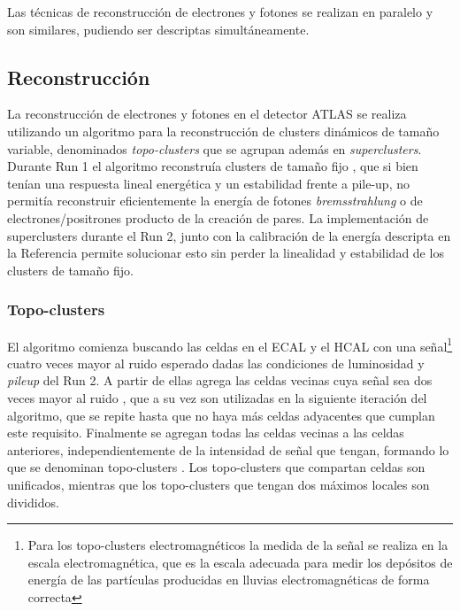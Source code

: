 Las técnicas de reconstrucción de electrones y fotones se realizan en paralelo y son similares, pudiendo ser descriptas simultáneamente.

\subsection{Reconstrucción}


La reconstrucción de electrones y fotones en el detector ATLAS se realiza utilizando un algoritmo para la reconstrucción de clusters dinámicos de tamaño variable, denominados \textit{topo-clusters} que se agrupan además en \textit{superclusters}\cite{EGAM-2018-01}. Durante Run 1 el algoritmo reconstruía clusters de tamaño fijo \cite{PERF-2013-04, PERF-2013-05, Lampl:1099735}, que si bien tenían una respuesta lineal energética y un estabilidad frente a pile-up, no permitía reconstruir eficientemente la energía de fotones \textit{bremsstrahlung} o de electrones/positrones producto de la creación de pares. La implementación de superclusters durante el Run 2, junto con la calibración de la energía descripta en la Referencia \cite{PERF-2017-03} permite solucionar esto sin perder la linealidad y estabilidad de los clusters de tamaño fijo.

\subsubsection{Topo-clusters}

El algoritmo comienza buscando las celdas en el ECAL y el HCAL con una señal\footnote{Para los topo-clusters electromagnéticos la medida de la señal se realiza en la escala electromagnética, que es la escala adecuada para medir los depósitos de energía de las partículas producidas en lluvias electromagnéticas de forma correcta} cuatro veces mayor al ruido esperado dadas las condiciones de luminosidad y \textit{pileup} del Run 2. A partir de ellas agrega las celdas vecinas cuya señal sea dos veces mayor al ruido
, que a su vez son utilizadas en la siguiente iteración del algoritmo, que se repite hasta que no haya más celdas adyacentes que cumplan este requisito. Finalmente se agregan todas las celdas vecinas a las celdas anteriores, independientemente de la intensidad de señal que tengan, formando lo que se denominan topo-clusters \cite{PERF-2014-07, Lampl:1099735}. Los topo-clusters que compartan celdas son unificados, mientras que los topo-clusters que tengan dos máximos locales son divididos.


